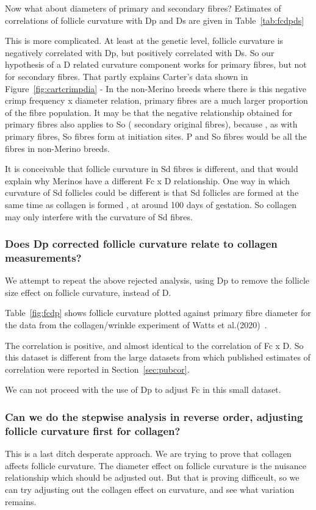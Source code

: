 \documentclass{article}
\begin{document}
Now what about diameters of primary and secondary fibres? Estimates of correlations of follicle curvature with Dp and Ds are given in Table~\ref{tab:fcdpds}

This is more complicated. At least at the genetic level, follicle curvature is negatively correlated with Dp, but positively correlated with Ds. So our hypothesis of a D related curvature component works for primary fibres, but not for secondary fibres. That partly explains Carter's data shown in Figure~\ref{fig:cartcrimpdia} - In the non-Merino breeds where there is this negative crimp frequency x diameter relation, primary fibres are a much larger proportion of the fibre population. It may be that the negative relationship obtained for primary fibres also applies to So ( secondary original fibres), because , as with primary fibres, So fibres form at initiation sites. P and So fibres would be all the fibres in non-Merino breeds. 

It is conceivable that follicle curvature in Sd fibres is different, and that would explain why Merinos have a different Fc x D relationship. One way in which curvature of Sd follicles could be different is that Sd follicles are formed at the same time as collagen is formed , at around 100 days of gestation. So collagen may only interfere with the curvature of Sd fibres.  

\subsubsection{Does Dp corrected follicle curvature relate to collagen measurements?}
We attempt to repeat the above rejected analysis, using Dp to remove the follicle size effect on follicle curvature, instead of D.

Table~\ref{fig:fcdp} shows follicle curvature plotted against primary fibre diameter for the data from the collagen/wrinkle experiment of Watts et al.(2020)~\cite{watts-2020}.

The correlation is positive, and almost identical to the correlation of Fc x D. So this dataset is different from the large datasets from which published estimates of correlation were reported in Section~\ref{sec:pubcor}.

We can not proceed with the use of Dp to adjust Fc in this small dataset. 

\subsubsection{Can we do the stepwise analysis in reverse order, adjusting follicle curvature first for collagen?}
This is a last ditch desperate approach. We are trying to prove that collagen affects follicle curvature. The diameter effect on follicle curvature is the nuisance relationship which should be adjusted out. But that is proving difficeult,  so we can try adjusting out the collagen effect on curvature, and see what variation remains.
\end{document}
